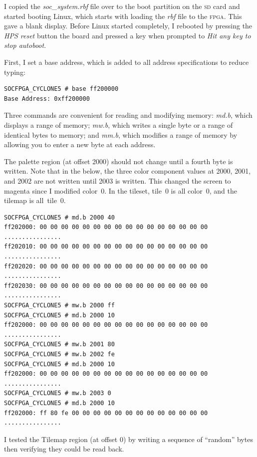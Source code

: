 \documentclass[11pt]{article}
\begin{document}
I copied the \emph{soc\_system.rbf} file over to the boot partition on
the \textsc{sd} card and started booting Linux, which starts with
loading the \emph{rbf} file to the \textsc{fpga}.  This gave a blank
display.  Before Linux started completely, I rebooted by pressing the
\emph{HPS reset} button the board and pressed a key when prompted to
\emph{Hit any key to stop autoboot}.

First, I set a base address, which is added to all address
specifications to reduce typing:

{\footnotesize 
\begin{verbatim}
SOCFPGA_CYCLONE5 # base ff200000 
Base Address: 0xff200000
\end{verbatim}
}

Three commands are convenient for reading and modifying memory:
\emph{md.b}, which displays a range of memory; \emph{mw.b}, which
writes a single byte or a range of identical bytes to memory; and
\emph{mm.b}, which modifies a range of memory by allowing you to enter
a new byte at each address.

The palette region (at offset 2000) should not change until a fourth
byte is written.  Note that in the below, the three color component
values at 2000, 2001, and 2002 are not written until 2003 is written.
This changed the screen to magenta since I modified color~0.  In the
tileset, tile~0 is all color~0, and the tilemap is all~tile~0.

{\footnotesize 
\begin{verbatim}
SOCFPGA_CYCLONE5 # md.b 2000 40 
ff202000: 00 00 00 00 00 00 00 00 00 00 00 00 00 00 00 00    ................
ff202010: 00 00 00 00 00 00 00 00 00 00 00 00 00 00 00 00    ................
ff202020: 00 00 00 00 00 00 00 00 00 00 00 00 00 00 00 00    ................
ff202030: 00 00 00 00 00 00 00 00 00 00 00 00 00 00 00 00    ................
SOCFPGA_CYCLONE5 # mw.b 2000 ff 
SOCFPGA_CYCLONE5 # md.b 2000 10
ff202000: 00 00 00 00 00 00 00 00 00 00 00 00 00 00 00 00    ................
SOCFPGA_CYCLONE5 # mw.b 2001 80 
SOCFPGA_CYCLONE5 # mw.b 2002 fe
SOCFPGA_CYCLONE5 # md.b 2000 10
ff202000: 00 00 00 00 00 00 00 00 00 00 00 00 00 00 00 00    ................
SOCFPGA_CYCLONE5 # mw.b 2003 0
SOCFPGA_CYCLONE5 # md.b 2000 10 
ff202000: ff 80 fe 00 00 00 00 00 00 00 00 00 00 00 00 00    ................
\end{verbatim}
}

\clearpage

I tested the Tilemap region (at offset 0) by writing a sequence of
``random'' bytes then verifying they could be read back.
\end{document}

